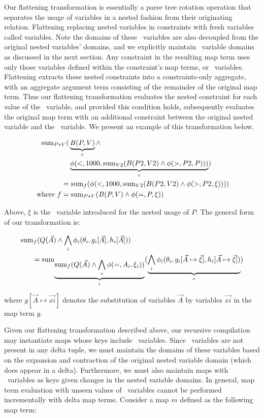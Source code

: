 Our flattening transformation is essentially a parse tree rotation operation
that separates the usage of variables in a nested fashion from their originating
relation. Flattening replacing nested variables in constraints with fresh
variables called \textit{\bigsum} variables.
Note the domains of these \bigsum\ variables are also decoupled from the
original nested variables' domains, and we explicitly maintain \bigsum\ variable
domains as discussed in the next section.  Any constraint in the resulting map
term uses only those variables defined within the constraint's map terms, or
\bigsum\ variables. Flattening extracts these nested constraints into a
constraints-only aggregate, with an aggregate argument term consisting of the
remainder of the original map term. Thus our flattening transformation evaluates
the nested constraint for each value of the \bigsum\ variable, and provided this
condition holds, subsequently evaluates the original map term with an additional
constraint between the original nested variable and the \bigsum\ variable. We
present an example of this transformation below.

\begin{align*}
\mathrm{sum}_{P*V}( & \underbrace{B(P,V)}_{r} \wedge \\
& \underbrace{\phi(<, 1000, \mathrm{sum}_{V2}(B(P2,V2) \wedge \phi(>, P2, P)))}_{c}) \\
= & \; \mathrm{sum}_{f}(\phi(<, 1000, \mathrm{sum}_{V2}(B(P2,V2) \wedge \phi(>, P2, \xi)))) \\
\mbox{ where } f = & \; \mathrm{sum}_{P*V}(B(P,V) \wedge \phi(=,P,\xi))
\end{align*}

Above, $\xi$ is the \bigsum\ variable introduced for the nested usage of $P$.
The general form of our transformation is:

\begin{align*}
\mathrm{sum}_{f}( & Q(\vec{A}) \wedge \bigwedge_i \phi_i(\theta_i, g_i[\vec{A}], h_i[\vec{A}])) \\
= & \; \mathrm{sum}_{
\underbrace{\mathrm{sum}_{f}(Q(\vec{A}) \wedge \bigwedge_i \phi(=,A_i,\xi_i))}_{t}}(
\underbrace{\bigwedge_i \phi_i(\theta_i, g_i[\vec{A} \mapsto \vec{\xi}], h_i[\vec{A} \mapsto \vec{\xi}])}_{c})
\end{align*}

\noindent where $g[\vec{A} \mapsto \vec{xi}]$ denotes the substitution of
variables $\vec{A}$ by variables $\vec{xi}$ in the map term $g$. 

Given our flattening transformation described above, our recursive compilation
may instantiate maps whose keys include \bigsum\ variables. Since \bigsum\
variables are not present in any delta tuple, we must maintain the domains of
these variables based on the expansion and contraction of the original nested
variable domain (which does appear in a delta). Furthermore, we must also
maintain maps with \bigsum\ variables as keys given changes in the nested
variable domains. In general, map term evaluation with unseen values of \bigsum\
variables cannot be performed incrementally with delta map terms. Consider a map
$m$ defined as the following map term:

